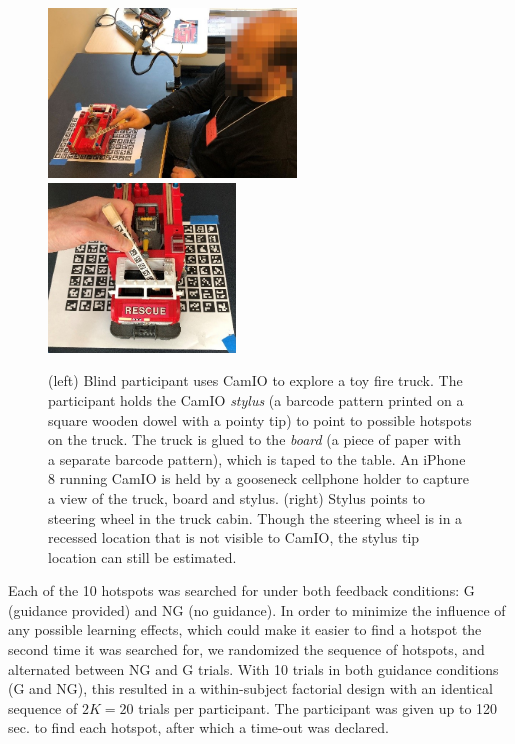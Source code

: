 \documentclass[runningheads]{res/templates/llncs}
\begin{document}
\begin{figure}
\includegraphics[width=0.58\linewidth,height=4.5cm]{res/img/fig1a}
\includegraphics[width=0.42\linewidth,height=4.5cm]{res/img/fig1b} 
\caption{(left) Blind participant uses CamIO to explore a toy fire truck. The participant holds the CamIO {\em stylus} (a barcode pattern printed on a square wooden dowel with a pointy tip) to point to possible hotspots on the truck. The truck is glued to the {\em board} (a piece of paper with a separate barcode pattern), which is taped to the table. An iPhone 8 running CamIO is held by a gooseneck cellphone holder to capture a view of the truck, board and stylus. (right) Stylus points to steering wheel in the truck cabin. Though the steering wheel is in a recessed location that is not visible to CamIO, the stylus tip location can still be estimated.}
\label{fig:exp}
\end{figure}

Each of the 10 hotspots was searched for under both feedback conditions: G (guidance provided) and NG (no guidance). 
In order to minimize the influence of any possible learning effects, which could make it easier to find a hotspot the second time it was searched for, we randomized the sequence of hotspots, and alternated between NG and G trials. With 10 trials in both guidance conditions (G and NG), this resulted in a within-subject factorial design with an identical sequence of $2K = 20$ trials per participant.
The participant was given up to 120 sec. to find each hotspot, after which a time-out was declared.
\end{document}
